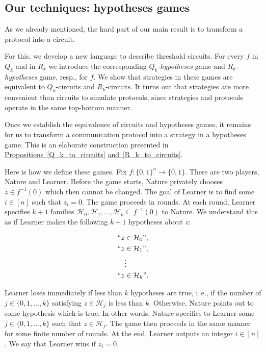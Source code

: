 \documentclass[11pt]{article}
\numberwithin{equation}{section}
\theoremstyle{definition}
\theoremstyle{plain}
\newcommand{\ie}{i.\,e.}
\newcommand{\expref}[2]{\hyperref[#2]{#1~\ref{#2}}}
\begin{document}
\subsection{Our techniques: hypotheses games}

As we already mentioned, the hard part of our main result is to transform a protocol into a circuit. 



For this, we develop a new language to describe threshold circuits.
%
For  %
every $f$ in $Q_k$ %
and in $R_k$   %
we introduce the corresponding \emph{$Q_k$-hypotheses}
%
game and  \emph{$R_k$-hypotheses} game, resp.,  %
for $f$. We show that strategies in these games are equivalent to $Q_k$-circuits and $R_k$-circuits.
It turns out that strategies are more convenient than circuits to simulate protocols, since strategies and protocols operate in the same top-bottom manner.

Once we establish the equivalence of circuits and hypotheses games, it remains for us to transform a communication protocol into a strategy in a hypotheses game. This is an elaborate construction presented in \expref{Propositions}{Q_k_to_circuits} \expref{and}{R_k_to_circuits}. %



Here is how we define these games. Fix $f\colon\{0, 1\}^n \to \{0, 1\}$. There are two players, Nature and Learner. Before the game starts, Nature privately chooses $z\in f^{-1}(0)$ which then cannot be changed. The goal of Learner is to find some $i\in [n]$ such that $z_i = 0$. The game proceeds in rounds. At each round, Learner specifies $k + 1$ families $\mathcal{H}_0, \mathcal{H}_1, \ldots, \mathcal{H}_{k} \subseteq f^{-1}(0)$ to Nature. We understand this as if Learner makes the following $k + 1$ hypotheses about $z$:

\begin{align*}
``z&\in\mathcal{H}_0\mbox{''}, \\
``z&\in\mathcal{H}_1\mbox{''}, \\
&\vdots \\
``z&\in\mathcal{H}_{k}\mbox{''}.
\end{align*}

Learner loses immediately if less than $k$ hypotheses are true, \ie, if the number of $j\in\{0, 1, \ldots, k\}$ satisfying $z\in\mathcal{H}_j$ is less than $k$. Otherwise, Nature points out to some hypothesis which is true. In other words, Nature specifies to Learner some $j\in \{0, 1, \ldots, k\}$ such that $z\in \mathcal{H}_j$. The game then proceeds in the same manner for some finite number of rounds. At the end, Learner outputs an integer $i\in [n]$. We say that Learner wins if  $z_i = 0$.
\end{document}

